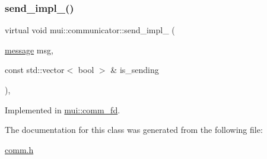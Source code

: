 \subsubsection{\texorpdfstring{send\+\_\+impl\+\_\+()}{send\_impl\_()}}
{\footnotesize\ttfamily virtual void mui\+::communicator\+::send\+\_\+impl\+\_\+ (\begin{DoxyParamCaption}\item[{\hyperlink{structmui_1_1message}{message}}]{msg,  }\item[{const std\+::vector$<$ bool $>$ \&}]{is\+\_\+sending }\end{DoxyParamCaption})\hspace{0.3cm}{\ttfamily [protected]}, {}}



Implemented in \hyperlink{classmui_1_1comm__fd_a025e0264f0424a2b28f3c14ecde5ba24}{mui\+::comm\+\_\+fd}.



The documentation for this class was generated from the following file\+:\begin{DoxyCompactItemize}
\item 
\hyperlink{comm_8h}{comm.\+h}\end{DoxyCompactItemize}
